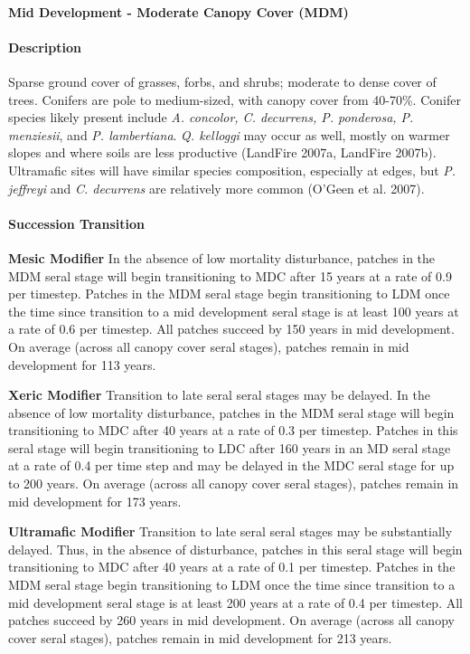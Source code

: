 \noindent\hrulefill

\paragraph{Mid Development - Moderate Canopy Cover (MDM)}

\paragraph{Description} Sparse ground cover of grasses, forbs, and shrubs; moderate to dense cover of trees. Conifers are pole to medium-sized, with canopy cover from 40-70\%. Conifer species likely present include \emph{A. concolor, C. decurrens, P. ponderosa, P. menziesii}, and \emph{P. lambertiana}. \emph{Q. kelloggi} may occur as well, mostly on warmer slopes and where soils are less productive (LandFire 2007a, LandFire 2007b). Ultramafic sites will have similar species composition, especially at edges, but \emph{P. jeffreyi} and \emph{C. decurrens} are relatively more common (O'Geen et al. 2007).

\paragraph{Succession Transition}
\begin{adjustwidth}{2cm}{}
\textbf{Mesic Modifier } In the absence of low mortality disturbance, patches in the MDM seral stage will begin transitioning to MDC after 15 years at a rate of 0.9 per timestep. Patches in the MDM seral stage begin transitioning to LDM once the time since transition to a mid development seral stage is at least 100 years at a rate of 0.6 per timestep. All patches succeed by 150 years in mid development. On average (across all canopy cover seral stages), patches remain in mid development for 113 years.

\medskip
\noindent \textbf{Xeric Modifier}  Transition to late seral seral stages may be delayed. In the absence of low mortality disturbance, patches in the MDM seral stage will begin transitioning to MDC after 40 years at a rate of 0.3 per timestep. Patches in this seral stage will begin transitioning to LDC after 160 years in an MD seral stage at a rate of 0.4 per time step and may be delayed in the MDC seral stage for up to 200 years. On average (across all canopy cover seral stages), patches remain in mid development for 173 years. 

\medskip
\noindent \textbf{Ultramafic Modifier} Transition to late seral seral stages may be substantially delayed. Thus, in the absence of disturbance, patches in this seral stage will begin transitioning to MDC after 40 years at a rate of 0.1 per timestep. Patches in the MDM seral stage begin transitioning to LDM once the time since transition to a mid development seral stage is at least 200 years at a rate of 0.4 per timestep. All patches succeed by 260 years in mid development. On average (across all canopy cover seral stages), patches remain in mid development for 213 years.

\end{adjustwidth}

